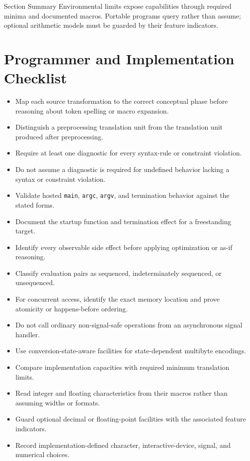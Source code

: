 \documentclass[10pt,letterpaper]{article}
\begin{document}
\begin{CornellSummaryBox}{Section Summary}
Environmental limits expose capabilities through required minima and documented macros. Portable programs query rather than assume; optional arithmetic models must be guarded by their feature indicators.
\end{CornellSummaryBox}



\section{Programmer and Implementation Checklist}
\begin{itemize}
  \item[$\square$] Map each source transformation to the correct conceptual phase before reasoning about token spelling or macro expansion.
  \item[$\square$] Distinguish a preprocessing translation unit from the translation unit produced after preprocessing.
  \item[$\square$] Require at least one diagnostic for every syntax-rule or constraint violation.
  \item[$\square$] Do not assume a diagnostic is required for undefined behavior lacking a syntax or constraint violation.
  \item[$\square$] Validate hosted \texttt{main}, \texttt{argc}, \texttt{argv}, and termination behavior against the stated forms.
  \item[$\square$] Document the startup function and termination effect for a freestanding target.
  \item[$\square$] Identify every observable side effect before applying optimization or as-if reasoning.
  \item[$\square$] Classify evaluation pairs as sequenced, indeterminately sequenced, or unsequenced.
  \item[$\square$] For concurrent access, identify the exact memory location and prove atomicity or happens-before ordering.
  \item[$\square$] Do not call ordinary non-signal-safe operations from an asynchronous signal handler.
  \item[$\square$] Use conversion-state-aware facilities for state-dependent multibyte encodings.
  \item[$\square$] Compare implementation capacities with required minimum translation limits.
  \item[$\square$] Read integer and floating characteristics from their macros rather than assuming widths or formats.
  \item[$\square$] Guard optional decimal or floating-point facilities with the associated feature indicators.
  \item[$\square$] Record implementation-defined character, interactive-device, signal, and numerical choices.
\end{itemize}
\end{document}
